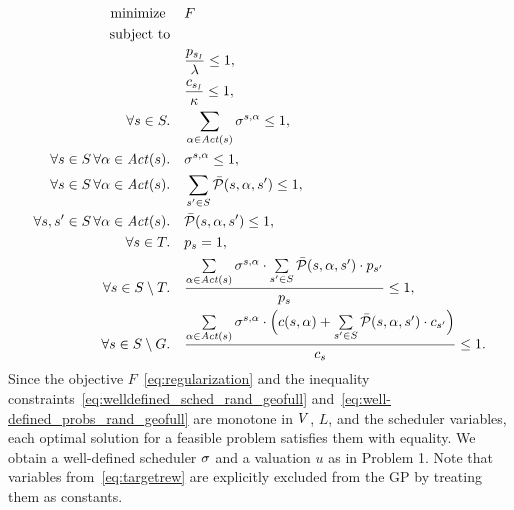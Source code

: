 \begin{align}
			\text{minimize } &\quad F\label{eq:min_rand_geofull}\\
			\text{subject to}\notag \\
							 &\quad \frac{p_{\sinit}}{\lambda}\leq 1\label{eq:lambda_geofull},\\
							 &\quad \frac{c_{\sinit}}{\kappa}\leq 1\label{eq:kappa_geofull},\\
			\forall s\in S.	&\quad \sum_{\act\in\Act(s)}\sched^{s,\act}\leq 1\label{eq:welldefined_sched_rand_geofull},\\
			\forall s\in S\, \forall\act\in\Act(s). &\quad \sched^{s,\act} \leq 1			\label{eq:sched_is_dist_geofull},\\					%
			\forall s\in S\, \forall\act\in\Act(s).	 &\quad \sum_{s'\in S}\bar\probmdp(s,\act,s')\leq 1\label{eq:well-defined_probs_rand_geofull},\\
				\forall s, s'\in S\, \forall\act\in\Act(s).	 &\quad\bar{\probmdp}(s,\act,s') \leq 1,	\label{eq:probs_is_prob_geofull}\\
	\forall s\in T.	&\quad p_s=1,															\label{eq:targetprob_rand_geofull}\\
			\forall s\in S\setminus T.	&\quad \frac{\sum\limits_{\act\in\Act(s)}\sigma^{s,\act}\cdot\sum\limits_{s'\in S}	\bar\probmdp(s,\act,s')\cdot p_{s'}}{p_s}\leq 1\label{eq:probcomputation_rand_geofull},\\
			\forall s\in S\setminus G.	&\quad \frac{\sum\limits_{\act\in\Act(s)} \sigma^{s,\act} \cdot \Bigl(c(s,\act) + \sum\limits_{s'\in S}	\bar\probmdp (s,\act,s') \cdot c_{s'}\Bigr)}{c_s}\leq 1 \label{eq:rewcomputation_geofull}.
\end{align}
%
Since the objective $F$~\eqref{eq:regularization} and the inequality constraints~\eqref{eq:welldefined_sched_rand_geofull} and~\eqref{eq:well-defined_probs_rand_geofull} are monotone in ${V}$, $L$, and the scheduler variables, each optimal solution for a feasible problem satisfies them with equality. We obtain a well-defined scheduler $\sigma$ and a valuation $u$ as in Problem 1. Note that variables from~\eqref{eq:targetrew} are explicitly excluded from the GP by treating them as constants.


